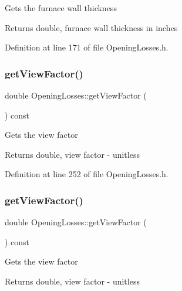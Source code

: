 Gets the furnace wall thickness \begin{DoxyReturn}{Returns}
double, furnace wall thickness in inches 
\end{DoxyReturn}


Definition at line 171 of file Opening\+Losses.\+h.

\mbox{\label{class_opening_losses_ae6633fab7a941e00b9770bee6a3af34d}} 
\subsubsection{\texorpdfstring{get\+View\+Factor()}{getViewFactor()}\hspace{0.1cm}{\footnotesize\ttfamily [1/3]}}
{\footnotesize\ttfamily double Opening\+Losses\+::get\+View\+Factor (\begin{DoxyParamCaption}{ }\end{DoxyParamCaption}) const\hspace{0.3cm}{\ttfamily [inline]}}

Gets the view factor \begin{DoxyReturn}{Returns}
double, view factor -\/ unitless 
\end{DoxyReturn}


Definition at line 252 of file Opening\+Losses.\+h.

\mbox{\label{class_opening_losses_ae6633fab7a941e00b9770bee6a3af34d}} 
\subsubsection{\texorpdfstring{get\+View\+Factor()}{getViewFactor()}\hspace{0.1cm}{\footnotesize\ttfamily [2/3]}}
{\footnotesize\ttfamily double Opening\+Losses\+::get\+View\+Factor (\begin{DoxyParamCaption}{ }\end{DoxyParamCaption}) const\hspace{0.3cm}{\ttfamily [inline]}}

Gets the view factor \begin{DoxyReturn}{Returns}
double, view factor -\/ unitless 
\end{DoxyReturn}


